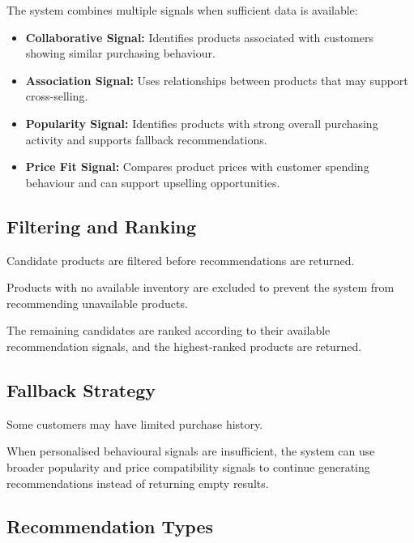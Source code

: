 \documentclass[12pt,a4paper]{report}
\begin{document}
The system combines multiple signals when sufficient data is available:

\begin{itemize}[leftmargin=1.2cm]

    \item \textbf{Collaborative Signal:}
    Identifies products associated with customers showing similar
    purchasing behaviour.

    \item \textbf{Association Signal:}
    Uses relationships between products that may support cross-selling.

    \item \textbf{Popularity Signal:}
    Identifies products with strong overall purchasing activity and
    supports fallback recommendations.

    \item \textbf{Price Fit Signal:}
    Compares product prices with customer spending behaviour and can
    support upselling opportunities.

\end{itemize}


\subsection{Filtering and Ranking}

Candidate products are filtered before recommendations are returned.

Products with no available inventory are excluded to prevent the system
from recommending unavailable products.

The remaining candidates are ranked according to their available
recommendation signals, and the highest-ranked products are returned.


\subsection{Fallback Strategy}

Some customers may have limited purchase history.

When personalised behavioural signals are insufficient, the system can
use broader popularity and price compatibility signals to continue
generating recommendations instead of returning empty results.


\subsection{Recommendation Types}
\end{document}
